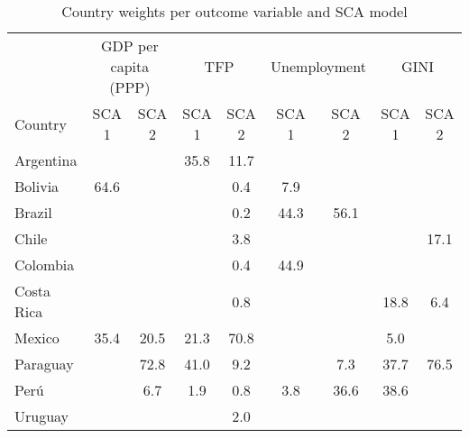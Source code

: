 \begin{table}[!htbp]
\begin{center}
\caption{Country weights per outcome variable and SCA model} \label{table:countries}
\begin{tabular}{l c c c c c c c c} \\ \toprule
  & \multicolumn{2}{c}{GDP per capita (PPP)} & \multicolumn{2}{c}{TFP} & \multicolumn{2}{c}{Unemployment} & \multicolumn{2}{c}{GINI}                \\ 
  Country    & SCA 1 & SCA 2 & SCA 1 & SCA 2 & SCA 1 & SCA 2 & SCA 1 & SCA 2 \\ \midrule
  Argentina  &       &       &  35.8 &  11.7 &       &       &       &       \\
  Bolivia    &  64.6 &       &       &   0.4 &   7.9 &       &       &       \\
  Brazil     &       &       &       &   0.2 &  44.3 &  56.1 &       &       \\
  Chile      &       &       &       &   3.8 &       &       &       &  17.1 \\
  Colombia   &       &       &       &   0.4 &  44.9 &       &       &       \\
  Costa Rica &       &       &       &   0.8 &       &       &  18.8 &   6.4 \\
  Mexico     &  35.4 &  20.5 &  21.3 &  70.8 &       &       &   5.0 &       \\
  Paraguay   &       &  72.8 &  41.0 &   9.2 &       &   7.3 &  37.7 &  76.5 \\
  Perú       &       &   6.7 &   1.9 &   0.8 &   3.8 &  36.6 &  38.6 &       \\
  Uruguay    &       &       &       &   2.0 &       &       &       &       \\
  \bottomrule 
\end{tabular}
\end{center}
\end{table}